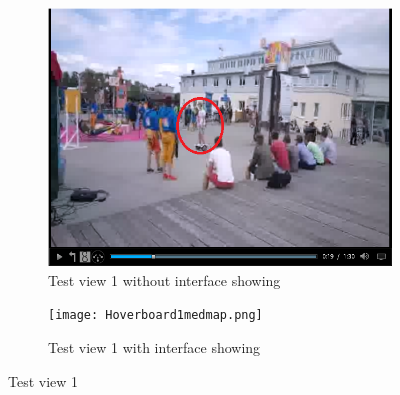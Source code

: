\begin{figure}
\begin{subfigure}[b]{0.5\textwidth}
 	\includegraphics[width=\linewidth]{Hoverboard_1.png}
  	\caption{Test view 1 without interface showing}\label{fig:testview1A}
    \end{subfigure}\hfill 
    \hspace{3px}
    \begin{subfigure}[b]{0.5\textwidth}
	\texttt{[image: Hoverboard1medmap.png]}
  	\caption{Test view 1 with interface showing}\label{fig:testview1B}
    \end{subfigure}
	\caption{Test view 1}
	\label{fig:testview1}
\end{figure}

